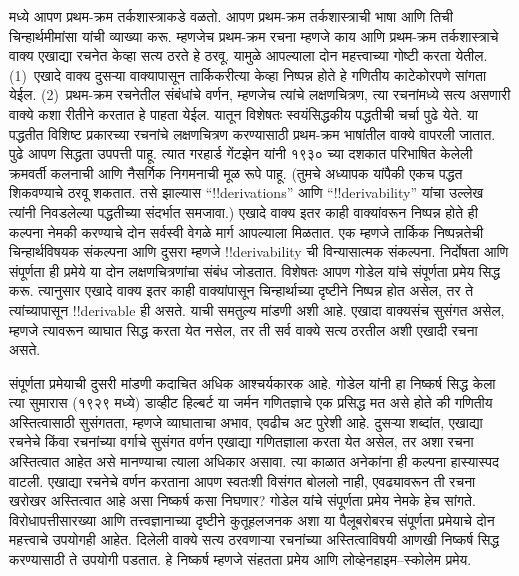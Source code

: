  मध्ये आपण प्रथम-क्रम तर्कशास्त्राकडे वळतो. आपण प्रथम-क्रम तर्कशास्त्राची भाषा आणि तिची चिन्हार्थमीमांसा यांची व्याख्या करू. म्हणजेच प्रथम-क्रम रचना म्हणजे काय आणि प्रथम-क्रम तर्कशास्त्राचे वाक्य एखाद्या रचनेत केव्हा सत्य ठरते हे ठरवू. यामुळे आपल्याला दोन महत्त्वाच्या गोष्टी करता येतील. (1)~एखादे वाक्य दुसऱ्या वाक्यापासून तार्किकरीत्या केव्हा निष्पन्न होते हे गणितीय काटेकोरपणे सांगता येईल. (2)~प्रथम-क्रम रचनेतील संबंधांचे वर्णन, म्हणजेच त्यांचे लक्षणचित्रण, त्या रचनांमध्ये सत्य असणारी वाक्ये कशा रीतीने करतात हे पाहता येईल. यातून विशेषतः स्वयंसिद्धकीय पद्धतीची चर्चा पुढे येते. या पद्धतीत विशिष्ट प्रकारच्या रचनांचे लक्षणचित्रण करण्यासाठी प्रथम-क्रम भाषांतील वाक्ये वापरली जातात. पुढे आपण सिद्धता उपपत्ती पाहू. त्यात गरहार्ड गेंटझेन यांनी १९३० च्या दशकात परिभाषित केलेली क्रमवर्ती कलनाची आणि नैसर्गिक निगमनाची मूळ रूपे पाहू. (तुमचे अध्यापक यांपैकी एकच पद्धत शिकवण्याचे ठरवू शकतात. तसे झाल्यास ``!!{derivation}s'' आणि ``!!{derivability}'' यांचा उल्लेख त्यांनी निवडलेल्या पद्धतीच्या संदर्भात समजावा.) एखादे वाक्य इतर काही वाक्यांवरून निष्पन्न होते ही कल्पना नेमकी करण्याचे दोन सर्वस्वी वेगळे मार्ग आपल्याला मिळतात. एक म्हणजे तार्किक निष्पन्नतेची चिन्हार्थविषयक संकल्पना आणि दुसरा म्हणजे !!{derivability} ची विन्यासात्मक संकल्पना. निर्दोषता आणि संपूर्णता ही प्रमेये या दोन लक्षणचित्रणांचा संबंध जोडतात. विशेषतः आपण गोडेल यांचे संपूर्णता प्रमेय सिद्ध करू. त्यानुसार एखादे वाक्य इतर काही वाक्यांपासून चिन्हार्थाच्या दृष्टीने निष्पन्न होत असेल, तर ते त्यांच्यापासून !!{derivable} ही असते. याची समतुल्य मांडणी अशी आहे. एखादा वाक्यसंच सुसंगत असेल, म्हणजे त्यावरून व्याघात सिद्ध करता येत नसेल, तर ती सर्व वाक्ये सत्य ठरतील अशी एखादी रचना असते.

संपूर्णता प्रमेयाची दुसरी मांडणी कदाचित अधिक आश्चर्यकारक आहे. गोडेल यांनी हा निष्कर्ष सिद्ध केला त्या सुमारास (१९२९ मध्ये) डाव्हीट हिल्बर्ट या जर्मन गणितज्ञाचे एक प्रसिद्ध मत असे होते की गणितीय अस्तित्वासाठी सुसंगतता, म्हणजे व्याघाताचा अभाव, एवढीच अट पुरेशी आहे. दुसऱ्या शब्दांत, एखाद्या रचनेचे किंवा रचनांच्या वर्गाचे सुसंगत वर्णन एखाद्या गणितज्ञाला करता येत असेल, तर अशा रचना अस्तित्वात आहेत असे मानण्याचा त्याला अधिकार असावा. त्या काळात अनेकांना ही कल्पना हास्यास्पद वाटली. एखाद्या रचनेचे वर्णन करताना आपण स्वतःशी विसंगत बोललो नाही, एवढ्यावरून ती रचना खरोखर अस्तित्वात आहे असा निष्कर्ष कसा निघणार? गोडेल यांचे संपूर्णता प्रमेय नेमके हेच सांगते. विरोधापत्तीसारख्या आणि तत्त्वज्ञानाच्या दृष्टीने कुतूहलजनक अशा या पैलूबरोबरच संपूर्णता प्रमेयाचे दोन महत्त्वाचे उपयोगही आहेत. दिलेली वाक्ये सत्य ठरवणाऱ्या रचनांच्या अस्तित्वाविषयी आणखी निष्कर्ष सिद्ध करण्यासाठी ते उपयोगी पडतात. हे निष्कर्ष म्हणजे संहतता प्रमेय आणि लोव्हेनहाइम--स्कोलेम प्रमेय.

